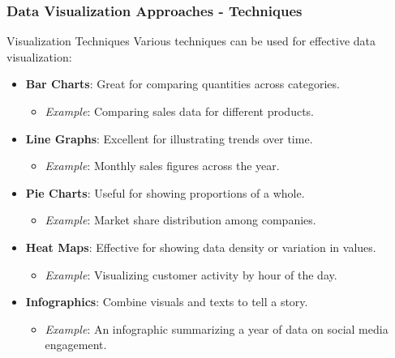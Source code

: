 \documentclass{beamer}
\begin{document}
\begin{frame}[fragile]
    \frametitle{Data Visualization Approaches - Techniques}
    
    \begin{block}{Visualization Techniques}
        Various techniques can be used for effective data visualization:
    \end{block}
    
    \begin{itemize}
        \item \textbf{Bar Charts}: Great for comparing quantities across categories. 
            \begin{itemize}
                \item \textit{Example}: Comparing sales data for different products.
            \end{itemize}
        
        \item \textbf{Line Graphs}: Excellent for illustrating trends over time.
            \begin{itemize}
                \item \textit{Example}: Monthly sales figures across the year.
            \end{itemize}
        
        \item \textbf{Pie Charts}: Useful for showing proportions of a whole.
            \begin{itemize}
                \item \textit{Example}: Market share distribution among companies.
            \end{itemize}

        \item \textbf{Heat Maps}: Effective for showing data density or variation in values.
            \begin{itemize}
                \item \textit{Example}: Visualizing customer activity by hour of the day.
            \end{itemize}

        \item \textbf{Infographics}: Combine visuals and texts to tell a story.
            \begin{itemize}
                \item \textit{Example}: An infographic summarizing a year of data on social media engagement.
            \end{itemize}
    \end{itemize}
    

\end{frame}
\end{document}
